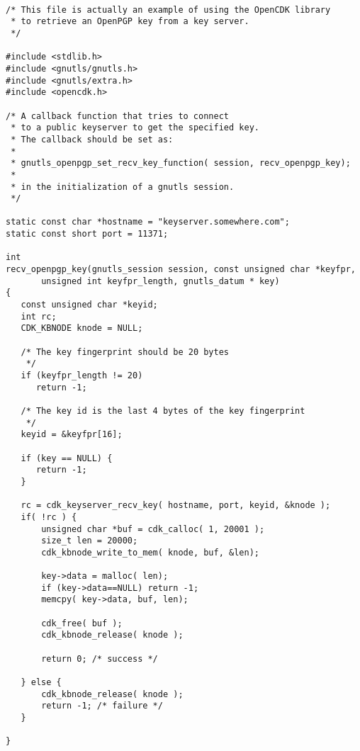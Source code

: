 \begin {verbatim}

/* This file is actually an example of using the OpenCDK library
 * to retrieve an OpenPGP key from a key server.
 */

#include <stdlib.h>
#include <gnutls/gnutls.h>
#include <gnutls/extra.h>
#include <opencdk.h>

/* A callback function that tries to connect
 * to a public keyserver to get the specified key.
 * The callback should be set as:
 *
 * gnutls_openpgp_set_recv_key_function( session, recv_openpgp_key);
 *
 * in the initialization of a gnutls session.
 */

static const char *hostname = "keyserver.somewhere.com";
static const short port = 11371;

int
recv_openpgp_key(gnutls_session session, const unsigned char *keyfpr, 
       unsigned int keyfpr_length, gnutls_datum * key)
{
   const unsigned char *keyid;
   int rc;
   CDK_KBNODE knode = NULL;

   /* The key fingerprint should be 20 bytes
    */
   if (keyfpr_length != 20)
      return -1;

   /* The key id is the last 4 bytes of the key fingerprint
    */
   keyid = &keyfpr[16];

   if (key == NULL) {
      return -1;
   }

   rc = cdk_keyserver_recv_key( hostname, port, keyid, &knode );
   if( !rc ) {
       unsigned char *buf = cdk_calloc( 1, 20001 );
       size_t len = 20000;
       cdk_kbnode_write_to_mem( knode, buf, &len);

       key->data = malloc( len);
       if (key->data==NULL) return -1;
       memcpy( key->data, buf, len);

       cdk_free( buf );
       cdk_kbnode_release( knode );

       return 0; /* success */

   } else {
       cdk_kbnode_release( knode );
       return -1; /* failure */
   }

}


\end{verbatim}
